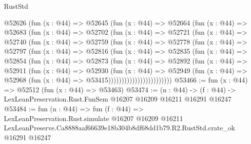 \begin{lexlean}{RustStd}
\begin{coremodule}
            @52626
              (fun (x : @44) =>
              @52645
                (fun (x : @44) =>
                @52664
                  (fun (x : @44) =>
                  @52683
                    (fun (x : @44) =>
                    @52702
                      (fun (x : @44) =>
                      @52721
                        (fun (x : @44) =>
                        @52740
                          (fun (x : @44) =>
                          @52759
                            (fun (x : @44) =>
                            @52778
                              (fun (x : @44) =>
                              @52797
                                (fun (x : @44) =>
                                @52816
                                  (fun (x : @44) =>
                                  @52835
                                    (fun (x : @44) =>
                                    @52854
                                      (fun (x : @44) =>
                                      @52873
                                        (fun (x : @44) =>
                                        @52892
                                          (fun (x : @44) =>
                                          @52911
                                            (fun (x : @44) =>
                                            @52930
                                              (fun (x : @44) =>
                                              @52949
                                                (fun (x : @44) =>
                                                @52968
                                                  (fun (x : @44) => @53415))))))))))))))))))))))))
@53466 := fun (x : @44) => @52512 (fun (x : @44) => @53463)
@53474 := (n : @44) ->
  (f : @44) -> LexLeanPreservation.Rust.FunSem @16207 @16209 @16211 @16291 @16247
@53484 := fun (n : @44) =>
  fun (f : @44) =>
  LexLeanPreservation.Rust.simulate
    @16207
    @16209
    @16211
    LexLeanPreserve.Ca8888aaf66639e18b304b8df68dd1b79.R2.RustStd.crate_ok
    @16291
    @16247
\end{coremodule}
\end{lexlean}
